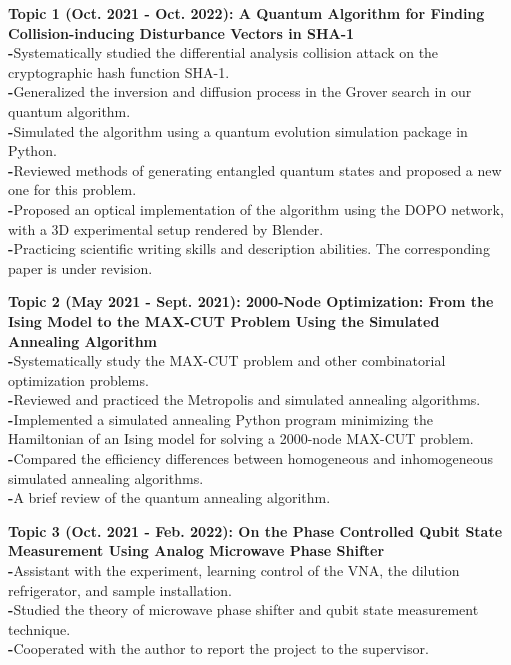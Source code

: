 \documentclass[a4paper,20pt]{article}
\newcommand{\resumeItempromax}[2]{
  \item\small{
    \textbf{#1}{ #2 \vspace{-2pt}}
  }
}
\begin{document}
    \vspace{5pt}
    
    \resumeItempromax{Topic 1 (Oct. 2021 - Oct. 2022): A Quantum Algorithm for Finding Collision-inducing Disturbance Vectors in SHA-1\\}{\textbf{-}Systematically studied the differential analysis collision attack on the cryptographic hash function SHA-1.\\
    \textbf{-}Generalized the inversion and diffusion process in the Grover search in our quantum algorithm.\\
    \textbf{-}Simulated the algorithm using a quantum evolution simulation package in Python.\\
    \textbf{-}Reviewed methods of generating entangled quantum states and proposed a new one for this problem.\\
    \textbf{-}Proposed an optical implementation of the algorithm using the DOPO network, with a 3D experimental setup rendered by Blender.\\
    \textbf{-}Practicing scientific writing skills and description abilities. The corresponding paper is under revision.}
    
    \vspace{5pt}
    
    \resumeItempromax{Topic 2 (May 2021 - Sept. 2021): 2000-Node Optimization: From the Ising Model to the MAX-CUT Problem Using the Simulated Annealing Algorithm\\}{\textbf{-}Systematically study the MAX-CUT problem and other combinatorial optimization problems.\\
    \textbf{-}Reviewed and practiced the Metropolis and simulated annealing algorithms.\\
    \textbf{-}Implemented a simulated annealing Python program minimizing the Hamiltonian of an Ising model for solving a 2000-node MAX-CUT problem.\\
    \textbf{-}Compared the efficiency differences between homogeneous and inhomogeneous simulated annealing algorithms.\\
    \textbf{-}A brief review of the quantum annealing algorithm.}

    \vspace{5pt}

    \resumeItempromax{Topic 3 (Oct. 2021 - Feb. 2022): On the Phase Controlled Qubit State Measurement Using Analog Microwave Phase Shifter\\}{\textbf{-}Assistant with the experiment, learning control of the VNA, the dilution refrigerator, and sample installation.\\
    \textbf{-}Studied the theory of microwave phase shifter and qubit state measurement technique.\\
    \textbf{-}Cooperated with the author to report the project to the supervisor.}
    
\end{document}
